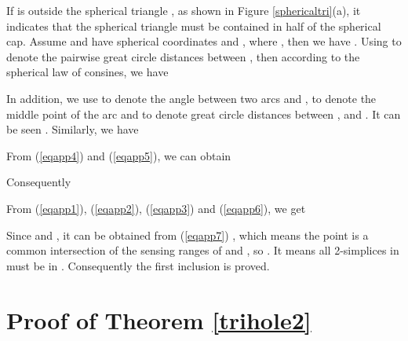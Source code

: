 \documentclass[journal, twoside]{IEEEtran}
\begin{document}
\begin{IEEEproof}
If  is outside the spherical triangle , as shown in Figure \ref{sphericaltri}(a), 
it indicates that the spherical triangle 
must be contained in half of the spherical cap. Assume  and  have spherical
coordinates  and , where
, then we have . Using  to denote
the pairwise great circle distances between , then according to 
the spherical law of consines, we have 


In addition, we use  to denote the angle between two arcs  and ,
 to denote the middle point of the arc  and  to 
denote great circle distances between ,  and . It can be seen .
Similarly, we have 


From (\ref{eqapp4}) and (\ref{eqapp5}), we can obtain 


Consequently 


From (\ref{eqapp1}), (\ref{eqapp2}), (\ref{eqapp3}) and (\ref{eqapp6}), we get


Since 
and , it can be obtained from (\ref{eqapp7}) 
, which means the point  is a common
intersection of the sensing ranges of  and , so 
.
It means all 2-simplices in  must be in .
Consequently the first inclusion is proved.

\end{IEEEproof}

\section{Proof of Theorem \ref{trihole2}} \label{app2}
\end{document}
